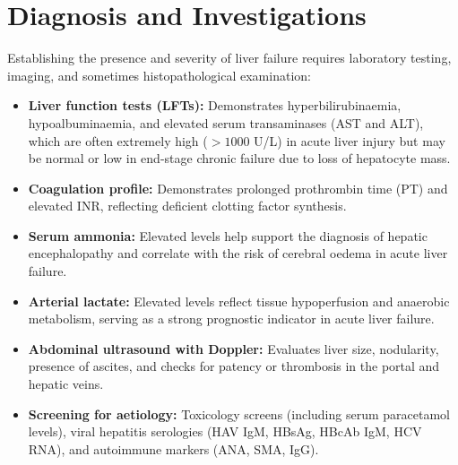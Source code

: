 \section*{Diagnosis and Investigations}
Establishing the presence and severity of liver failure requires laboratory testing, imaging, and sometimes histopathological examination:
\begin{itemize}
    \item \textbf{Liver function tests (LFTs):} Demonstrates hyperbilirubinaemia, hypoalbuminaemia, and elevated serum transaminases (AST and ALT), which are often extremely high ($>1000$ U/L) in acute liver injury but may be normal or low in end-stage chronic failure due to loss of hepatocyte mass.
    \item \textbf{Coagulation profile:} Demonstrates prolonged prothrombin time (PT) and elevated INR, reflecting deficient clotting factor synthesis.
    \item \textbf{Serum ammonia:} Elevated levels help support the diagnosis of hepatic encephalopathy and correlate with the risk of cerebral oedema in acute liver failure.
    \item \textbf{Arterial lactate:} Elevated levels reflect tissue hypoperfusion and anaerobic metabolism, serving as a strong prognostic indicator in acute liver failure.
    \item \textbf{Abdominal ultrasound with Doppler:} Evaluates liver size, nodularity, presence of ascites, and checks for patency or thrombosis in the portal and hepatic veins.
    \item \textbf{Screening for aetiology:} Toxicology screens (including serum paracetamol levels), viral hepatitis serologies (HAV IgM, HBsAg, HBcAb IgM, HCV RNA), and autoimmune markers (ANA, SMA, IgG).
\end{itemize}

